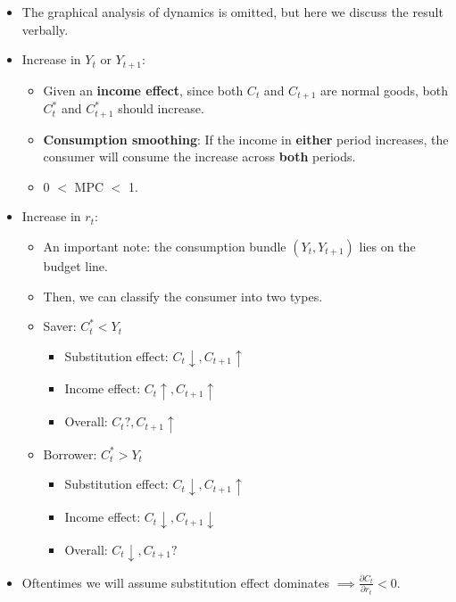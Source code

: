 \documentclass[notitlepage]{article}
\begin{document}
\begin{figure}[h]
    \centering
    \resizebox{0.7\textwidth}{!}{
    
    }
\end{figure}

\begin{itemize}
\item The graphical analysis of dynamics is omitted, but here we discuss the result verbally.

\item Increase in $Y_t$ or $Y_{t+1}$:
\begin{itemize}
\item Given an \textbf{income effect}, since both $C_t$ and $C_{t+1}$ are normal goods, both $C^*_t$ and $C^*_{t+1}$ should increase.
\item \textbf{Consumption smoothing}: If the income in \textbf{either} period increases, the consumer will consume the increase across \textbf{both} periods.
\item 0 $<$ MPC $<$ 1.
\end{itemize}

\item Increase in $r_t$:
\begin{itemize}
\item An important note: the consumption bundle $(Y_t, Y_{t+1})$ lies on the budget line.
\item Then, we can classify the consumer into two types.
\item Saver: $C^*_t < Y_t$
\begin{itemize}
\item Substitution effect: $C_t \downarrow, C_{t+1} \uparrow$
\item Income effect: $C_t \uparrow, C_{t+1} \uparrow$
\item Overall: $C_t ?, C_{t+1} \uparrow$
\end{itemize}
\item Borrower: $C^*_t > Y_t$
\begin{itemize}
\item Substitution effect: $C_t \downarrow, C_{t+1} \uparrow$
\item Income effect: $C_t \downarrow, C_{t+1} \downarrow$
\item Overall: $C_t \downarrow, C_{t+1}?$
\end{itemize}
\end{itemize}

\item Oftentimes we will assume substitution effect dominates $\implies \frac{\partial C_t}{\partial r_t} < 0$.


\end{itemize}
\end{document}
